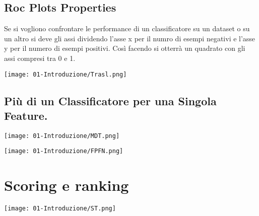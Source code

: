 \subsection{Roc Plots Properties}

Se si vogliono confrontare le performance di un classificatore su un dataset o su un altro si deve  gli assi dividendo l'asse x per il numro di esempi negativi e l'asse y per il numero di esempi positivi. Così facendo si otterrà un quadrato con gli assi compresi tra 0 e 1.

\begin{center} 
 \texttt{[image: 01-Introduzione/Trasl.png]}
\end{center}


\subsection{Più di un Classificatore per una Singola Feature.}

\begin{center} 
 \texttt{[image: 01-Introduzione/MDT.png]}
\end{center}


\begin{center} 
 \texttt{[image: 01-Introduzione/FPFN.png]}
\end{center}

\section{Scoring e ranking}



\begin{center} 
 \texttt{[image: 01-Introduzione/ST.png]}
\end{center}

